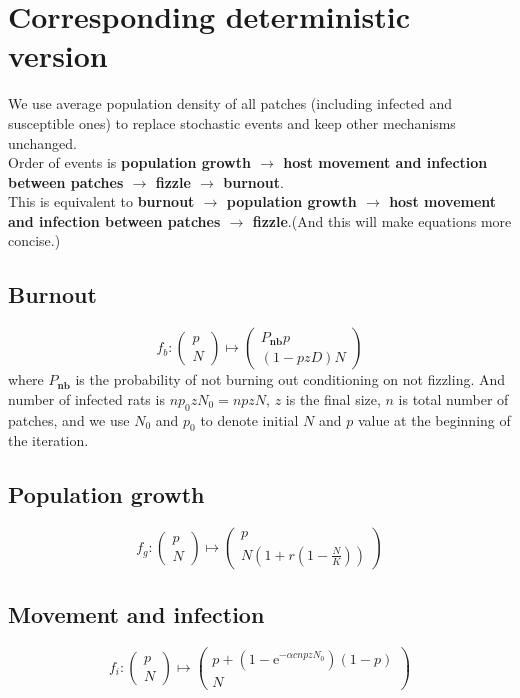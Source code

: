 \documentclass[12pt]{article}
\begin{document}
\section{Corresponding deterministic version}
We use average population density of all patches (including infected and susceptible ones) to replace stochastic events and keep other mechanisms unchanged. \\

Order of events is \textbf{population growth $\to$ host movement and infection between patches $\to$ fizzle $\to$ burnout}. \\

This is equivalent to \textbf{burnout $\to$ population growth $\to$ host movement and infection between patches $\to$ fizzle}.(And this will make equations more concise.)\\

\subsection{Burnout}
$$f_b:\begin{pmatrix}
    p\\N
\end{pmatrix}
\mapsto \begin{pmatrix}
    P_\textbf{nb}p\\
    (1-pzD)N
\end{pmatrix}$$
where $P_\textbf{nb}$ is the probability of not burning out conditioning on not fizzling. And number of infected rats is $np_0zN_0=npzN$, $z$ is the final size, $n$ is total number of patches, and we use $N_0$ and $p_0$ to denote initial $N$ and $p$ value at the beginning of the iteration. 

\subsection{Population growth}
$$f_g:\begin{pmatrix}
    p\\N
\end{pmatrix}
\mapsto \begin{pmatrix}
    p\\
    N(1+r(1-\frac{N}{K}))
\end{pmatrix}$$
\subsection{Movement and infection}
$$f_i:\begin{pmatrix}
    p\\N
\end{pmatrix}
\mapsto \begin{pmatrix}
    p+(1-\mathrm{e}^{-\alpha cnpzN_0})(1-p)\\
    N
\end{pmatrix}$$
\end{document}

